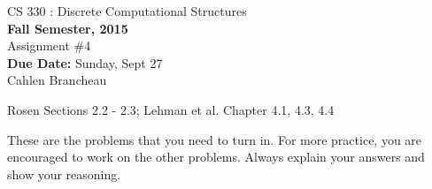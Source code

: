 \documentclass[12pt]{article}
\begin{document}
\begin{center}
{{\large CS 330 : Discrete Computational Structures}}\\

{\bf Fall Semester, 2015}\\

{\sc Assignment \#4}\\
{\bf Due Date:}  Sunday, Sept 27\\

Cahlen Brancheau

\end{center}

 Rosen Sections 2.2 - 2.3; Lehman et al. Chapter 4.1, 4.3, 4.4

These are the problems that you need to turn in. For more
practice, you are encouraged to work on the other problems. Always
explain your answers and show your reasoning.
\end{document}
